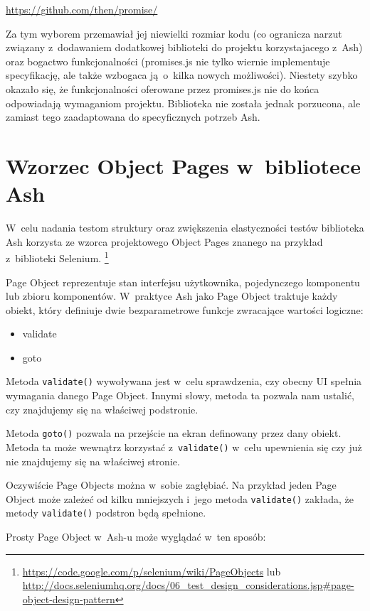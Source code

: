 \documentclass[brudnopis]{xmgr}
\begin{document}
\url{https://github.com/then/promise/}

Za tym wyborem przemawiał jej niewielki rozmiar kodu (co ogranicza narzut związany z~dodawaniem dodatkowej biblioteki do projektu korzystajacego z~Ash) oraz bogactwo funkcjonalności (promises.js nie tylko wiernie implementuje specyfikację, ale także wzbogaca ją~o~kilka nowych możliwości). Niestety szybko okazało się, że funkcjonalności oferowane przez promises.js nie do końca odpowiadają wymaganiom projektu. Biblioteka nie została jednak porzucona, ale zamiast tego zaadaptowana do specyficznych potrzeb Ash.  

\section{Wzorzec Object Pages w~bibliotece Ash}

W~celu nadania testom struktury oraz zwiększenia elastyczności testów biblioteka Ash korzysta ze wzorca projektowego Object Pages znanego na przykład z~biblioteki Selenium. 
\footnote{ \url{https://code.google.com/p/selenium/wiki/PageObjects}
lub
\url{http://docs.seleniumhq.org/docs/06\_test\_design\_considerations.jsp\#page-object-design-pattern} }

Page Object reprezentuje stan interfejsu użytkownika, pojedynczego komponentu lub zbioru komponentów. W~praktyce Ash jako Page Object traktuje każdy obiekt, który definiuje dwie bezparametrowe funkcje zwracające wartości logiczne:

\begin{itemize}
  \item validate
  \item goto
\end{itemize}

Metoda \texttt{validate()} wywoływana jest w~celu sprawdzenia, czy obecny UI spełnia wymagania danego Page Object. Innymi słowy, metoda ta pozwala nam ustalić, czy znajdujemy się na właściwej podstronie. 

Metoda \texttt{goto()} pozwala na przejście na ekran definowany przez dany obiekt. Metoda ta może wewnątrz korzystać z~\texttt{validate()} w~celu upewnienia się czy już nie znajdujemy się na właściwej stronie. 

Oczywiście Page Objects można w~sobie zagłębiać. Na przykład jeden Page Object może zależeć od kilku mniejszych i~jego metoda \texttt{validate()} zakłada, że metody \texttt{validate()} podstron będą spełnione. 

Prosty Page Object w~Ash-u może wyglądać w~ten sposób:
\end{document}
